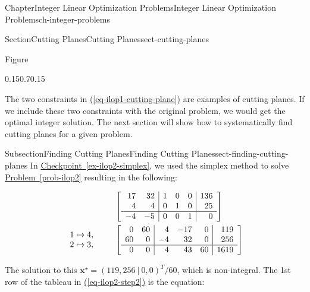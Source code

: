 \documentclass[oneside,10pt,]{book}
\newcommand{\xreffont}{\relax}
\numberwithin{equation}{section}
\newcommand{\amp}{&}
\begin{document}
\begin{chapterptx}{Chapter}{Integer Linear Optimization Problems}{}{Integer Linear Optimization Problems}{}{}{ch-integer-problems}
\begin{sectionptx}{Section}{Cutting Planes}{}{Cutting Planes}{}{}{sect-cutting-planes}
\begin{introduction}{}
\begin{figureptx}{Figure}
\begin{image}{0.15}{0.7}{0.15}{}
{\begin{tikzpicture}
\end{tikzpicture}%
}%
\end{image}%
\tcblower
\end{figureptx}%
The two constraints in \hyperref[eq-ilop1-cutting-plane]{({\xreffont\ref{eq-ilop1-cutting-plane}})} are examples of cutting planes. If we include these two constraints with the original problem, we would get the optimal integer solution. The next section will show how to systematically find cutting planes for a given problem.%
\end{introduction}%
%
%
\typeout{************************************************}
\typeout{************************************************}
%
\begin{subsectionptx}{Subsection}{Finding Cutting Planes}{}{Finding Cutting Planes}{}{}{sect-finding-cutting-planes}
In \hyperref[ex-ilop2-simplex]{Checkpoint~{\xreffont\ref{ex-ilop2-simplex}}}, we used the simplex method to solve \hyperref[prob-ilop2]{Problem~{\xreffont\ref{prob-ilop2}}} resulting in the following:%
\par
%
\begin{align}
\amp \qquad \left[\begin{array}{rr|rrr|r} 17 \amp 32 \amp 1 \amp 0 \amp 0 \amp 136\\ 4 \amp 4 \amp 0 \amp 1 \amp 0 \amp 25\\ \hline -4 \amp -5 \amp 0 \amp 0 \amp 1 \amp 0\\ \end{array} \right] \notag\\
\begin{array}{r} 1 \mapsto 4,\\ 2 \mapsto 3, \end{array} \amp \qquad \left[\begin{array}{rr|rrr|r} 0 \amp 60 \amp 4 \amp -17 \amp 0 \amp 119\\ 60 \amp 0 \amp -4 \amp 32 \amp 0 \amp 256\\ \hline 0 \amp 0 \amp 4 \amp 43 \amp 60 \amp 1619\\ \end{array} \right] \label{eq-ilop2-step2}
\end{align}
%
\par
The solution to this \(\boldsymbol{x}^{\star}= (119, 256~|~0,0)^{T}/60\), which is non-integral. The 1st row of the tableau in \hyperref[eq-ilop2-step2]{({\xreffont\ref{eq-ilop2-step2}})} is the equation:%
\par
%

\end{subsectionptx}
\end{sectionptx}
\end{chapterptx}
\end{document}
